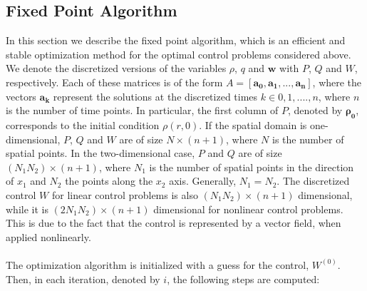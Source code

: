 \documentclass[11pt, a4paper]{article}
\theoremstyle{definition}
\newcommand{\adj}{q}
\begin{document}
\subsection{Fixed Point Algorithm}\label{sec:Method_SolverFP}
In this section we describe the fixed point algorithm, which is an efficient and stable optimization method for the optimal control problems considered above. 
We denote the discretized versions of the variables $\rho$, $\adj$ and $\mathbf{w}$ with $P$, $Q$ and $W$, respectively. Each of these matrices is of the form $A = [\boldsymbol{a_0}, \boldsymbol{a_1}, ... ,\boldsymbol{a_n}]$, where the vectors $\boldsymbol{a_k}$ represent the solutions at the discretized times $k \in 0,1,....,n$, where $n$ is the number of time points. In particular, the first column of $P$, denoted by $\boldsymbol{\rho_0}$, corresponds to the initial condition $\rho(r,0)$. If the spatial domain is one-dimensional, $P$, $Q$ and $W$ are of size $N \times (n + 1)$, where $N$ is the number of spatial points. In the two-dimensional case, $P$ and $Q$ are of size $(N_1N_2) \times (n + 1)$, where $N_1$ is the number of spatial points in the direction of $x_1$ and $N_2$ the points along the $x_2$ axis. Generally, $N_1 = N_2$. The discretized control $W$ for linear control problems is also $(N_1N_2) \times (n + 1)$ dimensional, while it is $(2N_1N_2) \times (n + 1)$ dimensional for nonlinear control problems. This is due to the fact that the control is represented by a vector field, when applied nonlinearly.
\\
\\
The optimization algorithm is initialized with a guess for the control, $W^{(0)}$. Then, in each iteration, denoted by $i$, the following steps are computed:
\vspace{0.1cm}
\end{document}
